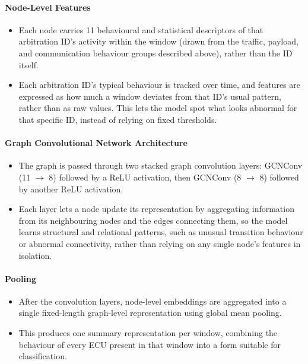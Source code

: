 \documentclass{article}
\begin{document}
\paragraph{Node-Level Features}
\begin{itemize}[noitemsep]
    \item Each node carries 11 behavioural and statistical descriptors of that arbitration ID's activity within the window (drawn from the traffic, payload, and communication behaviour groups described above), rather than the ID itself.
    \item Each arbitration ID's typical behaviour is tracked over time, and features are expressed as how much a window deviates from that ID's usual pattern, rather than as raw values. This lets the model spot what looks abnormal for that specific ID, instead of relying on fixed thresholds.
\end{itemize}

\paragraph{Graph Convolutional Network Architecture}
\begin{itemize}[noitemsep]
    \item The graph is passed through two stacked graph convolution layers: GCNConv (11 $\rightarrow$ 8) followed by a ReLU activation, then GCNConv (8 $\rightarrow$ 8) followed by another ReLU activation.
    \item Each layer lets a node update its representation by aggregating information from its neighbouring nodes and the edges connecting them, so the model learns structural and relational patterns, such as unusual transition behaviour or abnormal connectivity, rather than relying on any single node's features in isolation.
\end{itemize}

\paragraph{Pooling}
\begin{itemize}[noitemsep]
    \item After the convolution layers, node-level embeddings are aggregated into a single fixed-length graph-level representation using global mean pooling.
    \item This produces one summary representation per window, combining the behaviour of every ECU present in that window into a form suitable for classification.
\end{itemize}
\end{document}
